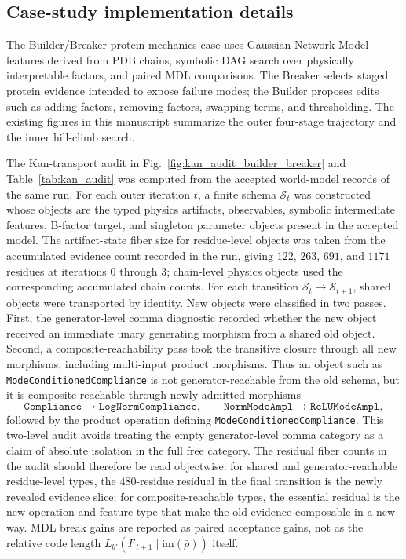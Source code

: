 \documentclass[11pt]{article}
\theoremstyle{definition}
\newcommand{\Sschema}{\mathcal{S}}
\begin{document}
\subsection{Case-study implementation details}

The Builder/Breaker protein-mechanics case uses Gaussian Network Model features derived from PDB chains, symbolic DAG search over physically interpretable factors, and paired MDL comparisons. The Breaker selects staged protein evidence intended to expose failure modes; the Builder proposes edits such as adding factors, removing factors, swapping terms, and thresholding. The existing figures in this manuscript summarize the outer four-stage trajectory and the inner hill-climb search.

The Kan-transport audit in Fig.~\ref{fig:kan_audit_builder_breaker} and Table~\ref{tab:kan_audit} was computed from the accepted world-model records of the same run. For each outer iteration $t$, a finite schema $\Sschema_t$ was constructed whose objects are the typed physics artifacts, observables, symbolic intermediate features, B-factor target, and singleton parameter objects present in the accepted model. The artifact-state fiber size for residue-level objects was taken from the accumulated evidence count recorded in the run, giving $122$, $263$, $691$, and $1171$ residues at iterations $0$ through $3$; chain-level physics objects used the corresponding accumulated chain counts. For each transition $\Sschema_t\to\Sschema_{t+1}$, shared objects were transported by identity. New objects were classified in two passes. First, the generator-level comma diagnostic recorded whether the new object received an immediate unary generating morphism from a shared old object. Second, a composite-reachability pass took the transitive closure through all new morphisms, including multi-input product morphisms. Thus an object such as \texttt{ModeConditionedCompliance} is not generator-reachable from the old schema, but it is composite-reachable through newly admitted morphisms
\[
\texttt{Compliance}\to\texttt{LogNormCompliance},\qquad
\texttt{NormModeAmpl}\to\texttt{ReLUModeAmpl},
\]
followed by the product operation defining \texttt{ModeConditionedCompliance}. This two-level audit avoids treating the empty generator-level comma category as a claim of absolute isolation in the full free category. The residual fiber counts in the audit should therefore be read objectwise: for shared and generator-reachable residue-level types, the $480$-residue residual in the final transition is the newly revealed evidence slice; for composite-reachable types, the essential residual is the new operation and feature type that make the old evidence composable in a new way. MDL break gains are reported as paired acceptance gains, not as the relative code length $L_{b'}(I'_{t+1}\mid\mathrm{im}(\bar\rho))$ itself.
\end{document}

